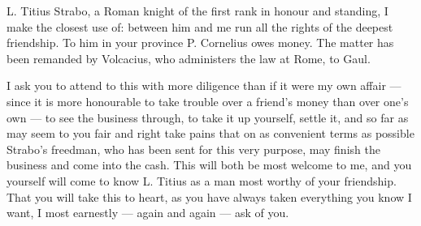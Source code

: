 

 L. Titius Strabo, a Roman knight of the first rank in honour and standing, I make the closest use of: between him and me run all the rights of the deepest friendship. To him in your province P. Cornelius owes money. The matter has been remanded by Volcacius, who administers the law at Rome, to Gaul.

 I ask you to attend to this with more diligence than if it were my own affair --- since it is more honourable to take trouble over a friend's money than over one's own --- to see the business through, to take it up yourself, settle it, and so far as may seem to you fair and right take pains that on as convenient terms as possible Strabo's freedman, who has been sent for this very purpose, may finish the business and come into the cash. This will both be most welcome to me, and you yourself will come to know L. Titius as a man most worthy of your friendship. That you will take this to heart, as you have always taken everything you know I want, I most earnestly --- again and again --- ask of you.
